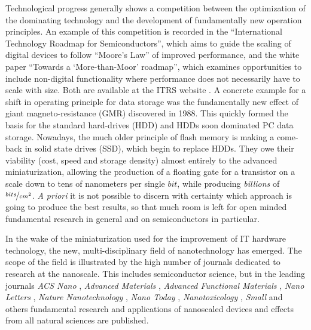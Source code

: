 



Technological progress generally shows a competition between the optimization of the dominating technology and the development of fundamentally new operation principles. An example of this competition is recorded in the ``International Technology Roadmap for Semiconductors'', which aims to guide the scaling of digital devices to follow ``Moore's Law'' of improved performance, and the white paper ``Towards a `More-than-Moor' roadmap'', which examines opportunities to include non-digital functionality where performance does not necessarily have to scale with size. Both are available at the ITRS website  \cite{map_http://www.itrs.net/_2015}. A concrete example for a shift in operating principle for data storage was the fundamentally new effect of giant magneto-resistance (GMR) discovered in 1988. This quickly formed the basis for the standard hard-drives (HDD) and HDDs soon dominated PC data storage. Nowadays, the much older principle of flash memory is making a come-back in solid state drives (SSD), which begin to replace HDDs. They owe their viability (cost, speed and storage density) almost entirely to the advanced miniaturization, allowing the production of a floating gate for a transistor on a scale down to tens of nanometers per single $bit$, while producing \emph{billions} of $\nicefrac{bits}{cm^{2}}$. \emph{A priori} it is not possible to discern with certainty which approach is going to produce the best results, so that much room is left for open minded fundamental research in general and on semiconductors in particular.

In the wake of the miniaturization used for the improvement of IT hardware technology, the new, multi-disciplinary field of nanotechnology has emerged. The scope of the field is illustrated by the high number of journals dedicated to research at the nanoscale. This includes semiconductor science, but in the leading journals \emph{ACS Nano} \cite{acs_nano_http://pubs.acs.org/journal/ancac3_2015}, \emph{Advanced Materials} \cite{advanced_materials_http://www.advmat./_2015}, \emph{Advanced Functional Materials} \cite{advanced_functional_materials_http://onlinelibrary.wiley.com/journal/10.1002/issn1616-3028_2015}, \emph{Nano Letters} \cite{nano_letters_http://pubs.acs.org/journal/nalefd_2015}, \emph{Nature Nanotechnology} \cite{nature_nanotechnology_http://www.nature.com/nnano_2015}, \emph{Nano Today} \cite{nano_today_http://journals.elsevier.com/17480132/nano-today/_2015}, \emph{Nanotoxicology} \cite{nanotoxicology_http://www.informahealthcare.com/nan_2015}, \emph{Small} \cite{small_http://www.small-journal.com/_2015} and others fundamental research and applications of nanoscaled devices and effects from all natural sciences are published.

